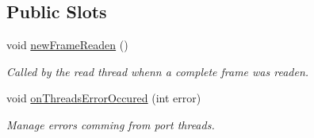\subsection*{Public Slots}
\begin{DoxyCompactItemize}
\item 
void \hyperlink{classmdt_port_manager_a4a2a146021158aeb72f9f4b6d62b6dd0}{newFrameReaden} ()
\begin{DoxyCompactList}\small\item\em Called by the read thread whenn a complete frame was readen. \end{DoxyCompactList}\item 
\hypertarget{classmdt_port_manager_a7e45b8e3475e5182ed12218616664d07}{
void \hyperlink{classmdt_port_manager_a7e45b8e3475e5182ed12218616664d07}{onThreadsErrorOccured} (int error)}
\label{classmdt_port_manager_a7e45b8e3475e5182ed12218616664d07}

\begin{DoxyCompactList}\small\item\em Manage errors comming from port threads. \end{DoxyCompactList}\end{DoxyCompactItemize}
